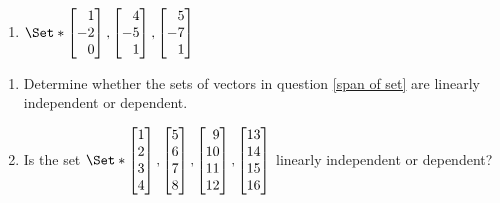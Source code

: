 \begin{exercises}
\begin{problist}
\begin{enumerate}
				\item   $\Set*{\mat{1\\-2\\0},\mat{4\\-5\\1},\mat{5\\-7\\1}}$
		\end{enumerate}
		\prob
		\begin{enumerate}
			\item Determine whether the sets of vectors in question \ref{span of set} are linearly
			independent or dependent.

			\item Is the set $\Set*{\mat{1\\2\\3\\4},\mat{5\\6\\7\\8},
			\mat{9\\10\\11\\12}, \mat{13\\14\\15\\16}}$ linearly independent or dependent?


\end{enumerate}
\end{problist}
\end{exercises}

